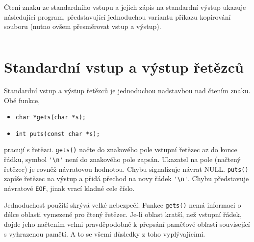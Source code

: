        
      \begin{lstlisting}[caption=\texttt{Cteni\_tisk\_znaku.c} Čtení a tisk znak ze standardního vstupu na standardní výstup.]
      \end{lstlisting}
    
    \begin{example}Čtení znaku ze standardního vstupu a jejich zápis na standardní výstup ukazuje následující program,
      představující jednoduchou variantu příkazu kopírování souboru (nutno ovšem přesměrovat vstup a výstup).

      
      \begin{lstlisting}[caption=\texttt{CPY.c} Kopíruje znak ze standardního vstupu na standardní výstup.]
      \end{lstlisting}
    \end{example}
    
  \section{Standardní vstup a výstup řetězců}
    Standardní vstup a výstup řetězců je jednoduchou nadstavbou nad čtením znaku. Obě funkce,
    \begin{itemize}
      \item \lstinline[basicstyle=\ttfamily]!char *gets(char *s);!
      \item \lstinline[basicstyle=\ttfamily]!int puts(const char *s);!
    \end{itemize}
    pracují s řetězci. \texttt{gets()} načte do znakového pole vstupní řetězec az do konce řádku, symbol
    \lstinline[basicstyle=\ttfamily]!'\n'! není do znakového pole zapsán. Ukazatel na pole (načtený řetězec) je rovněž návratovou
    hodnotou. Chybu signalizuje návrat NULL. \texttt{puts()} zapíše řetězec na výstup a přidá přechod na novy řádek
    \lstinline[basicstyle=\ttfamily]!'\n'!. Chybu představuje návratové \texttt{EOF}, jinak vrací kladné cele číslo.

    Jednoduchost použití skrývá velké nebezpečí. Funkce \texttt{gets()} nemá informaci o délce oblasti vymezené pro čtený
    řetězec. Je-li oblast kratší, než vstupní řádek, dojde jeho načtením velmi pravděpodobně k přepsání paměťové oblasti
    související s vyhrazenou pamětí. A to se všemi důsledky z toho vyplývajícími.


